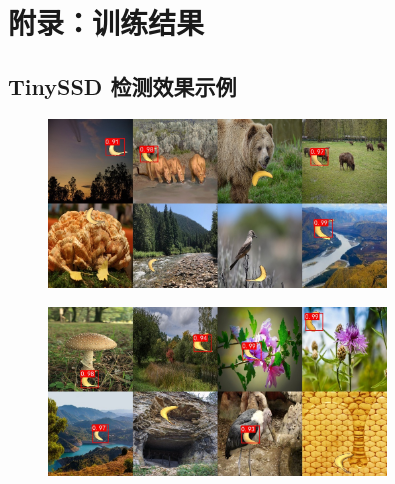 \documentclass[UTF8]{ctexart}
\begin{document}
\newpage
\section{附录：训练结果}
\subsection{TinySSD 检测效果示例}

\vspace*{\fill} %

\begin{center}
\begin{minipage}{\textwidth}
\begin{figure}[H]
    \centering
    \includegraphics[width=0.8\textwidth]{picture/combined_predictions_1.jpg}
\end{figure}
\vfill

\begin{figure}[H]
    \centering
    \includegraphics[width=0.8\textwidth]{picture/combined_predictions_2.jpg}
\end{figure}
\end{minipage}
\end{center}

\vspace*{\fill} %

\newpage

\vspace*{\fill} %
\end{document}
